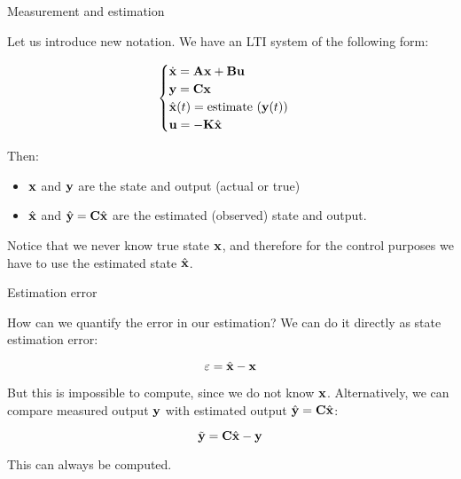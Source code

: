 \documentclass{beamer}
\begin{document}
\begin{frame}{Measurement and estimation}
\begin{flushleft}

Let us introduce new notation. We have an LTI system of the following form:

\begin{equation}
\begin{cases}
\dot {\mathbf{x}} = \mathbf{A} \mathbf{x} + \mathbf{B} \mathbf{u} \\
\mathbf{y} = \mathbf{C} \mathbf{x} \\
\hat{\mathbf{x}}(t) = \text{estimate} \ (\mathbf{y}(t)) \\
\mathbf{u} = -\mathbf{K}\hat{\mathbf{x}}
\end{cases}
\end{equation}

Then:

\begin{itemize}
\item $\mathbf{x}$ and $\mathbf{y}$ are the state and output (actual or true)
\item $\hat{\mathbf{x}}$ and $\hat{\mathbf{y}} =\mathbf{C} \hat{\mathbf{x}}$ are the estimated (observed) state
and output.
\end{itemize}

Notice that we never know true state $\mathbf{x}$, and therefore for the control purposes we have to use the estimated state $\hat{\mathbf{x}}$.

\end{flushleft}
\end{frame}




\begin{frame}{Estimation error}
	\begin{flushleft}
		
		How can we quantify the error in our estimation? We can do it directly as state estimation error:
		
		\begin{equation}
			\varepsilon = \hat{\mathbf{x}} - \mathbf{x}
		\end{equation}
		
		But this is impossible to compute, since we do not know $\mathbf{x}$. Alternatively, we can compare measured output $\mathbf{y}$ with estimated output $\hat{\mathbf{y}} =\mathbf{C} \hat{\mathbf{x}}$:
		
		\begin{equation}
			\Tilde{\mathbf{y}} = \mathbf{C} \hat{\mathbf{x}} - \mathbf{y} 
		\end{equation}		
		
		This can always be computed.
		
	\end{flushleft}
\end{frame}
\end{document}
